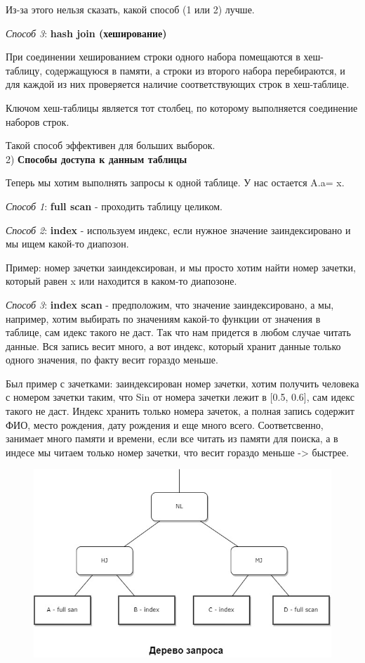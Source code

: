 Из-за этого нельзя сказать, какой способ (1 или 2) лучше. 

\textit{Способ 3}: \textbf{hash join (хеширование)}

При соединении хешированием строки одного набора помещаются в
хеш-таблицу, содержащуюся в памяти, а строки из второго набора
перебираются, и для каждой из них проверяется наличие
соответствующих строк в хеш-таблице.

Ключом хеш-таблицы является тот столбец, по которому выполняется
соединение наборов строк.

Такой способ эффективен для больших выборок. 
\\[15pt]
2) \textbf{Способы доступа к данным таблицы}

Теперь мы хотим выполнять запросы к одной таблице. У нас остается A.a= x. 

\textit{Способ 1}: \textbf{full scan} - проходить таблицу целиком. 

\textit{Способ 2}: \textbf{index} - используем индекс, если нужное значение заиндексировано и мы ищем какой-то диапозон. 

Пример: номер зачетки заиндексирован, и мы просто хотим найти номер зачетки, который равен x или находится в каком-то диапозоне. 

\textit{Способ 3}: \textbf{index scan} - предположим, что значение заиндексировано, а мы, например, хотим выбирать по значениям какой-то функции от значения в таблице, сам идекс такого не даст. Так что нам придется в любом случае читать данные. Вся запись весит много, а вот индекс, который хранит данные только одного значения, по факту весит гораздо меньше. 

Был пример с зачетками: заиндексирован номер зачетки, хотим получить человека с номером зачетки таким, что Sin от номера зачетки лежит в [0.5, 0.6], сам идекс такого не даст. Индекс хранить только номера зачеток, а полная запись содержит ФИО, место рождения, дату рождения и еще много всего. Соответсвенно, занимает много памяти и времени, если все читать из памяти для поиска, а в индесе мы читаем только номер зачетки, что весит гораздо меньше -> быстрее. 

\begin{figure}[H]
	\centering
	\includegraphics[scale = 0.5]{5/plan.jpg}
	\label{fig:plan1}
	\caption{}
\end{figure}

